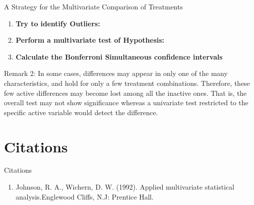 \documentclass[8pt]{beamer}
\begin{document}
\begin{frame}{A Strategy for the Multivariate Comparison of Treatments} %
    \begin{enumerate}
        \item \textbf{Try to identify Outliers:}
        \item \textbf{Perform a multivariate test of Hypothesis:}
        \item \textbf{Calculate the Bonferroni Simultaneous confidence intervals}
    \end{enumerate}
    
    \begin{alertblock}{Remark 2:}
        In some cases, differences may appear in only one of the many characteristics, and hold for only a few treatment combinations. Therefore, these few active differences may become lost among all the inactive ones. That is, the overall test may not show significance whereas a univariate test restricted to the specific active variable would detect the difference. 
    \end{alertblock}
    
\end{frame}

\section{Citations}

\begin{frame}{Citations}
    
    \begin{enumerate}
        \item Johnson, R. A.,  Wichern, D. W. (1992). Applied multivariate statistical analysis.Englewood Cliffs, N.J: Prentice Hall.
    \end{enumerate}
\end{frame}

\end{document}
